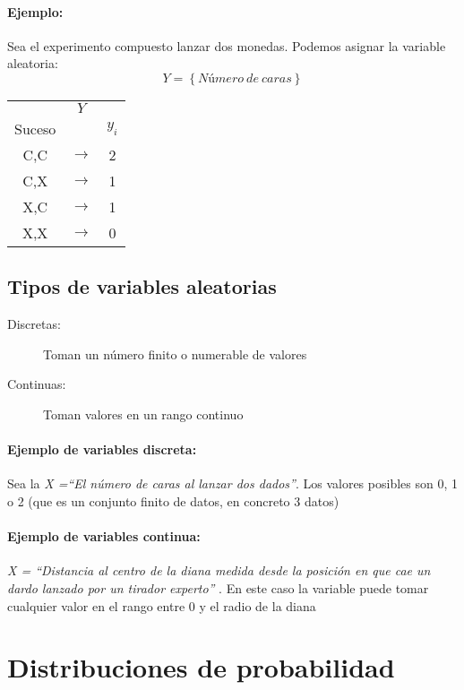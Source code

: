 \paragraph{Ejemplo:} Sea el experimento compuesto lanzar dos monedas. Podemos asignar la variable aleatoria: $$Y=\left\lbrace Número \ de \ caras \right\rbrace$$

\begin{center}
\begin{tabular}{ccc}
 & $Y$ &  \\
Suceso &  &  $y_i$\\ \hline 
C,C & $\rightarrow$ & 2 \\ 
C,X & $\rightarrow$ & 1 \\ 
X,C & $\rightarrow$ & 1 \\ 
X,X & $\rightarrow$ & 0 \\ 
\end{tabular} 
\end{center}

\subsection{Tipos de variables aleatorias}
\begin{description}
\item[Discretas:] Toman un número finito o numerable de valores
\item[Continuas:] Toman valores en un rango continuo
\end{description}

\paragraph{Ejemplo de variables discreta:} Sea la \emph{X =“El número de caras al lanzar dos dados”}. Los valores posibles son 0, 1 o 2 (que es un conjunto finito de datos, en concreto 3 datos) 

\paragraph{Ejemplo de variables continua:} \emph{X = “Distancia al centro de la diana medida desde la posición en que cae un dardo lanzado por un tirador experto” }. En este caso la variable puede tomar cualquier valor en el rango entre 0 y el radio de la diana 

\section{Distribuciones de probabilidad}

